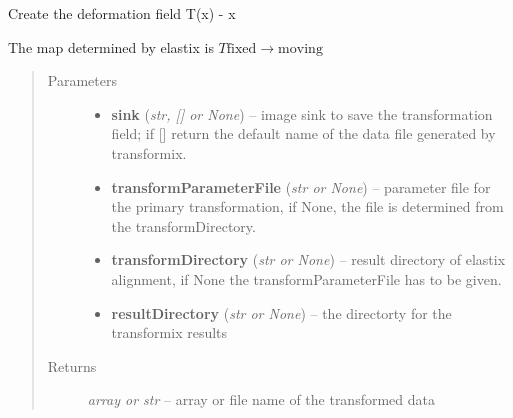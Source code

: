 \documentclass[letterpaper,10pt,english]{sphinxmanual}
\begin{document}
\begin{fulllineitems}
\label{api/ClearMap.Alignment:ClearMap.Alignment.Elastix.deformationField}
Create the deformation field T(x) - x

The map determined by elastix is
\(T \mathrm{fixed} \rightarrow \mathrm{moving}\)
\begin{quote}\begin{description}
\item[{Parameters}] \leavevmode\begin{itemize}
\item {} 
\textbf{sink} (\emph{str, {[}{]} or None}) --
image sink to save the transformation field; if {[}{]} return the default name of the data file generated by transformix.

\item {} 
\textbf{transformParameterFile} (\emph{str or None}) --
parameter file for the primary transformation, if None, the file is determined from the transformDirectory.

\item {} 
\textbf{transformDirectory} (\emph{str or None}) --
result directory of elastix alignment, if None the transformParameterFile has to be given.

\item {} 
\textbf{resultDirectory} (\emph{str or None}) --
the directorty for the transformix results

\end{itemize}

\item[{Returns}] \leavevmode
\emph{array or str} --
array or file name of the transformed data

\end{description}\end{quote}

\end{fulllineitems}

\end{document}
